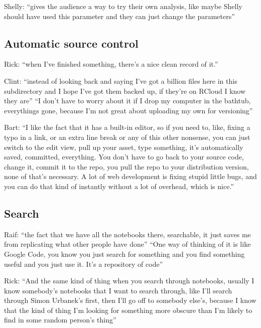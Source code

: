 Shelly: ``gives the audience a way to try their own analysis, like maybe Shelly should have used this parameter and they can just change the parameters''


\subsection{Automatic source control}
Rick: ``when I've finished something, there's a nice clean record of it.''

Clint: ``instead of looking back and saying I've got a billion files here in this subdirectory and I hope I've got them backed up, if they're on RCloud I know they are'' ``I don't have to worry about it if I drop my computer in the bathtub, everythings gone, because I'm not great about uploading my own for versioning''

Bart: ``I like the fact that it has a built-in editor, so if you need to, like, fixing a typo in a link, or an extra line break or any of this other nonsense, you can just switch to the edit view, pull up your asset, type something, it's automatically saved, committed, everything. You don't have to go back to your source code, change it, commit it to the repo, you pull the repo to your distribution version, none of that's necessary. A lot of web development is fixing stupid little bugs, and you can do that kind of instantly without a lot of overhead, which is nice.''


\subsection{Search}
Raif: ``the fact that we have all the notebooks there, searchable, it just saves me from replicating what other people have done'' ``One way of thinking of it is like Google Code, you know you just search for something and you find something useful and you just use it. It’s a repository of code''

Rick: ``And the same kind of thing when you search through notebooks, usually I know somebody’s notebooks that I want to search through, like I’ll search through Simon Urbanek’s first, then I’ll go off to somebody else’s, because I know that the kind of thing I’m looking for something more obscure than I’m likely to find in some random person’s thing''


